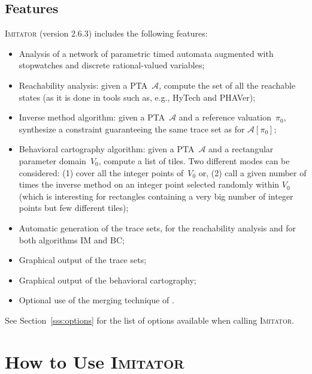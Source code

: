 \documentclass[a4paper,11pt]{article}
\newcommand{\A}{\mathcal{A}}
\newcommand{\IM}{\mathrm{IM}}
\newcommand{\carto}{\mathrm{BC}}
\newcommand{\hytech}{{\sc HyTech}}
\newcommand{\imitator}{\textsc{Imitator}}
\newcommand{\phaver}{PHAVer}
\newcommand{\imitatorversion}{2.6.3}
\begin{document}
	


\subsection{Features} \label{ss:features}

\imitator{} (version \imitatorversion{}) includes the following features:

\begin{itemize}
	\item Analysis of a network of parametric timed automata augmented with stopwatches and discrete rational-valued variables;
	\item Reachability analysis: given a PTA~$\A$, compute the set of all the reachable states (as it is done in tools such as, e.g., \hytech{} and \phaver{});
	\item Inverse method algorithm: given a PTA~$\A$ and a reference valuation~$\pi_0$, synthesize a constraint guaranteeing the same trace set as for $\A[\pi_0]$;
	\item Behavioral cartography algorithm: given a PTA~$\A$ and a rectangular parameter domain~$V_0$, compute a list of tiles. Two different modes can be considered: (1) cover all the integer points of~$V_0$ or, (2) call a given number of times the inverse method on an integer point selected randomly within $V_0$ (which is interesting for rectangles containing a very big number of integer points but few different tiles);
	\item Automatic generation of the trace sets, for the reachability analysis and for both algorithms $\IM$ and $\carto$;
	\item Graphical output of the trace sets;
	\item Graphical output of the behavioral cartography;
	\item Optional use of the merging technique of \cite{AFS12}.
\end{itemize}


See Section~\ref{sss:options} for the list of options available when calling \imitator{}.





\section{How to Use \imitator{}} \label{sec:how}
\end{document}
